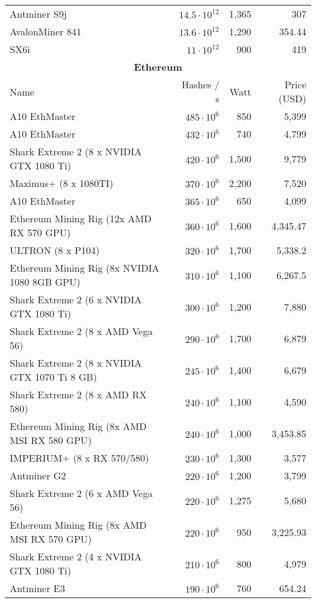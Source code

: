 \begin{longtable}{|p{}|r|r|r|}
  Antminer S9j & $14.5 \cdot 10^{12}$ & 1,365 & 307 \\
  AvalonMiner 841 & $13.6 \cdot 10^{12}$ & 1,290 & 354.44 \\
  SX6i & $11 \cdot 10^{12}$ & 900 & 419 \\
  \hline
  \multicolumn{4}{|c|}{\textbf{Ethereum}} \\
  \hline
  Name & Hashes / s & Watt & Price (USD) \\
  \hhline{|=|=|=|=|}
  A10 EthMaster & $485 \cdot 10^{6}$ & 850 & 5,399 \\
  A10 EthMaster & $432 \cdot 10^{6}$ & 740 & 4,799 \\
  Shark Extreme 2 (8 x NVIDIA GTX 1080 Ti) & $420 \cdot 10^{6}$ & 1,500 & 9,779 \\
  Maximus+ (8 x 1080TI) & $370 \cdot 10^{6}$ & 2,200 & 7,520 \\
  A10 EthMaster & $365 \cdot 10^{6}$ & 650 & 4,099 \\
  Ethereum Mining Rig (12x AMD RX 570 GPU) & $360 \cdot 10^{6}$ & 1,600 & 4,345.47 \\
  ULTRON (8 x P104) & $320 \cdot 10^{6}$ & 1,700 & 5,338.2 \\
  Ethereum Mining Rig (8x NVIDIA 1080 8GB GPU) & $310 \cdot 10^{6}$ & 1,100 & 6,267.5 \\
  Shark Extreme 2 (6 x NVIDIA GTX 1080 Ti) & $300 \cdot 10^{6}$ & 1,200 & 7,880 \\
  Shark Extreme 2 (8 x AMD Vega 56) & $290 \cdot 10^{6}$ & 1,700 & 6,879 \\
  Shark Extreme 2 (8 x NVIDIA GTX 1070 Ti 8 GB) & $245 \cdot 10^{6}$ & 1,400 & 6,679 \\
  Shark Extreme 2 (8 x AMD RX 580) & $240 \cdot 10^{6}$ & 1,100 & 4,590 \\
  Ethereum Mining Rig (8x AMD MSI RX 580 GPU) & $240 \cdot 10^{6}$ & 1,000 & 3,453.85 \\
  IMPERIUM+ (8 x RX 570/580) & $230 \cdot 10^{6}$ & 1,300 & 3,577 \\
  Antminer G2 & $220 \cdot 10^{6}$ & 1,200 & 3,799 \\
  Shark Extreme 2 (6 x AMD Vega 56) & $220 \cdot 10^{6}$ & 1,275 & 5,680 \\
  Ethereum Mining Rig (8x AMD MSI RX 570 GPU) & $220 \cdot 10^{6}$ & 950 & 3,225.93 \\
  Shark Extreme 2 (4 x NVIDIA GTX 1080 Ti) & $210 \cdot 10^{6}$ & 800 & 4,979 \\
  Antminer E3 & $190 \cdot 10^{6}$ & 760 & 654.24 \\

\end{longtable}
